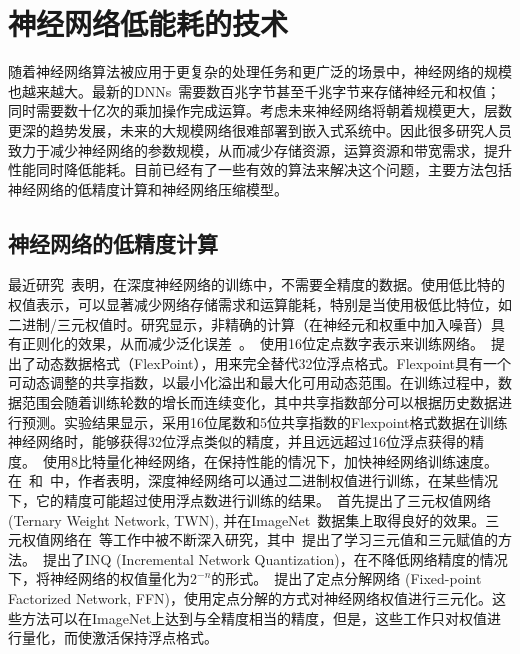 \section{神经网络低能耗的技术}
随着神经网络算法被应用于更复杂的处理任务和更广泛的场景中，神经网络的规模也越来越大。最新的DNNs~\cite{le2013building, coates2013deep}需要数百兆字节甚至千兆字节来存储神经元和权值；同时需要数十亿次的乘加操作完成运算。考虑未来神经网络将朝着规模更大，层数更深的趋势发展，未来的大规模网络很难部署到嵌入式系统中。因此很多研究人员致力于减少神经网络的参数规模，从而减少存储资源，运算资源和带宽需求，提升性能同时降低能耗。目前已经有了一些有效的算法来解决这个问题，主要方法包括神经网络的低精度计算和神经网络压缩模型。

\subsection{神经网络的低精度计算}

最近研究~\cite{gupta2015deep}表明，在深度神经网络的训练中，不需要全精度的数据。使用低比特的权值表示，可以显著减少网络存储需求和运算能耗，特别是当使用极低比特位，如二进制/三元权值时。研究显示，非精确的计算（在神经元和权重中加入噪音）具有正则化的效果，从而减少泛化误差~\cite{goodfellow2016deep}。~\citet{gupta2015deep}使用16位定点数字表示来训练网络。~\citet{koster2017flexpoint}提出了动态数据格式（FlexPoint），用来完全替代32位浮点格式。Flexpoint具有一个可动态调整的共享指数，以最小化溢出和最大化可用动态范围。在训练过程中，数据范围会随着训练轮数的增长而连续变化，其中共享指数部分可以根据历史数据进行预测。实验结果显示，采用16位尾数和5位共享指数的Flexpoint格式数据在训练神经网络时，能够获得32位浮点类似的精度，并且远远超过16位浮点获得的精度。~\citet{dettmers20158}使用8比特量化神经网络，在保持性能的情况下，加快神经网络训练速度。在~\cite{courbariaux2015binaryconnect}和~\cite{hu2018hashing}中，作者表明，深度神经网络可以通过二进制权值进行训练，在某些情况下，它的精度可能超过使用浮点数进行训练的结果。~\citet{rastegari2016xnor}首先提出了三元权值网络 (Ternary Weight Network, TWN), 并在ImageNet~\cite{russakovsky2015imagenet}数据集上取得良好的效果。三元权值网络在~\cite{li2016ternary,zhu2016trained}等工作中被不断深入研究，其中~\cite{zhu2016trained}提出了学习三元值和三元赋值的方法。~\citet{zhou2017incremental}提出了INQ (Incremental Network Quantization)，在不降低网络精度的情况下，将神经网络的权值量化为$2^{-n}$的形式。~\citet{wang2017fixed}提出了定点分解网络 (Fixed-point Factorized Network, FFN)，使用定点分解的方式对神经网络权值进行三元化。这些方法可以在ImageNet上达到与全精度相当的精度，但是，这些工作只对权值进行量化，而使激活保持浮点格式。

